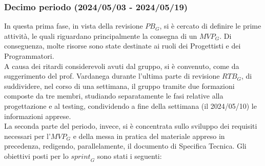 \subsubsection{Decimo periodo (2024/05/03 - 2024/05/19)}
In questa prima fase, in vista della revisione $\textit{PB}_G$, si è cercato di definire le prime attività, le quali riguardano principalmente la consegna di un $\textit{MVP}_G$. Di conseguenza, molte risorse sono state destinate ai ruoli dei Progettisti e dei Programmatori. \\
A causa dei ritardi considerevoli avuti dal gruppo, si è convenuto, come da suggerimento del prof. Vardanega durante l'ultima parte di revisione $\textit{RTB}_G$, di suddividere, nel corso di una settimana, il gruppo tramite due formazioni composte da tre membri, studiando separatamente le fasi relative alla progettazione e al testing, condividendo a fine della settimana (il 2024/05/10) le informazioni apprese. \\
La seconda parte del periodo, invece, si è concentrata sullo sviluppo dei requisiti necessari per l'$\textit{MVP}_G$ e della messa in pratica del materiale appreso in precedenza, redigendo, parallelamente, il documento di Specifica Tecnica.
Gli obiettivi posti per lo $\textit{sprint}_G$ sono stati i seguenti:
